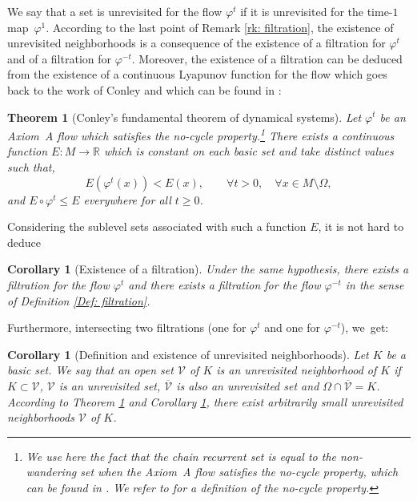 \documentclass[11pt]{article}
\theoremstyle{definition}
\theoremstyle{plain}
\newtheorem{thm}{Theorem}
\newtheorem{corollary}[definition]{Corollary}
\newcommand{\R}{\mathbb{R}}
\newcommand{\Vcal}{\mathcal{V}}
\begin{document}
We say that a set is unrevisited for the flow $\varphi^t$ if it is unrevisited for the time\nobreakdash-$1$ map~$\varphi^1$. According to the last point of Remark \ref{rk: filtration}, the existence of unrevisited neighborhoods is a consequence of the existence of a filtration for $\varphi^t$ and of a filtration for $\varphi^{-t}$. Moreover, the existence of a filtration can be deduced from the existence of a continuous Lyapunov function for the flow which goes back to the work of Conley \cite[p.\,20]{conley} and which can be found in \cite[Th.\,1.5.44 \& 5.3.47]{FH}:

\begin{thm}[Conley's fundamental theorem of dynamical systems]\label{prop: existence of continuous Lyapunov functions}
Let $\varphi^t$ be an Axiom~A flow which satisfies the no-cycle property.\footnote{We use here the fact that the chain recurrent set is equal to the non-wandering set when the Axiom~A flow satisfies the no-cycle property, which can be found in \cite[Th.\,5.3.47]{FH}. We refer to \cite[Def.\,5.3.42]{FH} for a definition of the no-cycle property.} There exists a continuous function $E: M \to \R$ which is constant on each basic set and take distinct values such that,
\[
E \left(\varphi^t (x) \right) < E (x), \qquad \forall t > 0, \quad \forall x \in M \setminus \Omega,
\]
and $E \circ \varphi^t \leq E$ everywhere for all $t \geq 0$.
\end{thm}

Considering the sublevel sets associated with such a function $E$, it is not hard to deduce

\begin{corollary}[Existence of a filtration]\label{cor: existence of filtrations} Under the same hypothesis, there exists a filtration for the flow $\varphi^t$ and there exists a filtration for the flow $\varphi^{-t}$ in the sense of Definition \ref{Def: filtration}.
\end{corollary}

Furthermore, intersecting two filtrations (one for $\varphi^t$ and one for $\varphi^{-t}$), we~get:

\begin{corollary}[Definition and existence of unrevisited neighborhoods]\label{prop: Robbin existence of unrevisited neighborhoods}Let $K$ be a basic set. We say that an open set $\Vcal$ of $K$ is an \emph{unrevisited neighborhood} of $K$ if $K \subset \Vcal$, $\Vcal$ is an unrevisited set, $\overline{\Vcal}$ is also an unrevisited set and $\Omega \cap \overline{\Vcal} = K$.
According to Theorem \ref{prop: existence of continuous Lyapunov functions} and Corollary \ref{cor: existence of filtrations}, there exist arbitrarily small unrevisited neighborhoods $\Vcal$ of $K$.
\end{corollary}
\end{document}
